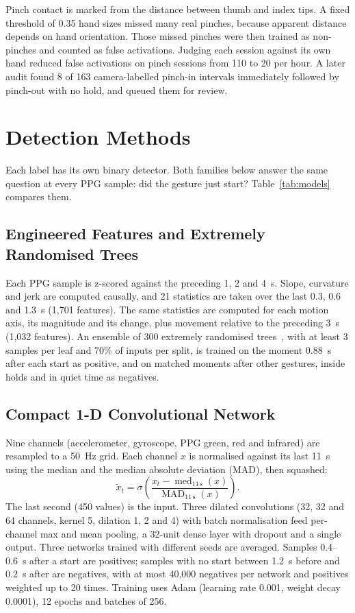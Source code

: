 Pinch contact is marked from the distance between thumb and index tips. A fixed threshold of 0.35 hand sizes missed many real pinches, because apparent distance depends on hand orientation. Those missed pinches were then trained as non-pinches and counted as false activations. Judging each session against its own hand reduced false activations on pinch sessions from 110 to 20 per hour. A later audit found 8 of 163 camera-labelled pinch-in intervals immediately followed by pinch-out with no hold, and queued them for review.

\section{Detection Methods}\label{sec:methods}

Each label has its own binary detector. Both families below answer the same question at every PPG sample: did the gesture just start? Table~\ref{tab:models} compares them.

\subsection{Engineered Features and Extremely Randomised Trees}

Each PPG sample is z-scored against the preceding 1, 2 and 4~s. Slope, curvature and jerk are computed causally, and 21 statistics are taken over the last 0.3, 0.6 and 1.3~s (1{,}701 features). The same statistics are computed for each motion axis, its magnitude and its change, plus movement relative to the preceding 3~s (1{,}032 features). An ensemble of 300 extremely randomised trees~\cite{geurts2006extra}, with at least 3 samples per leaf and 70\% of inputs per split, is trained on the moment 0.88~s after each start as positive, and on matched moments after other gestures, inside holds and in quiet time as negatives.

\subsection{Compact 1-D Convolutional Network}

Nine channels (accelerometer, gyroscope, PPG green, red and infrared) are resampled to a 50~Hz grid. Each channel $x$ is normalised against its last 11~s using the median and the median absolute deviation (MAD), then squashed:
\begin{equation}
  \tilde{x}_t = \sigma\!\left(\frac{x_t - \operatorname{med}_{11\,\mathrm{s}}(x)}{\operatorname{MAD}_{11\,\mathrm{s}}(x)}\right).
  \label{eq:norm}
\end{equation}
The last second (450 values) is the input. Three dilated convolutions (32, 32 and 64 channels, kernel 5, dilation 1, 2 and 4) with batch normalisation feed per-channel max and mean pooling, a 32-unit dense layer with dropout and a single output. Three networks trained with different seeds are averaged. Samples 0.4--0.6~s after a start are positives; samples with no start between 1.2~s before and 0.2~s after are negatives, with at most 40{,}000 negatives per network and positives weighted up to 20 times. Training uses Adam (learning rate 0.001, weight decay 0.0001), 12 epochs and batches of 256.

